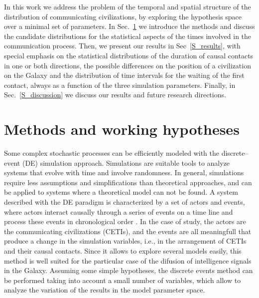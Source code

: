 \documentclass[crop]{CSLB}%
\begin{document}
In this work we address the problem of the temporal and spatial
structure of the distribution of communicating civilizations, by
exploring the hypothesis space over a minimal set of parameters.
%
In Sec.~\ref{S_methods} we introduce the methods and discuss the
candidate distributions for the statistical aspects of the times
involved in the communication process.
%
Then, we present our results in Sec~\ref{S_results}, with special
emphasis on the statistical distributions of the duration of causal
contacts in one or both directions, the possible differences on the
position of a civilization on the Galaxy and the distribution of time
intervals for the waiting of the first contact, always as a function
of the three simulation parameters.
%
Finally, in Sec.~\ref{S_discussion} we discuss our results and future
research directions.




\section{Methods and working hypotheses}\label{S_methods}


Some complex stochastic processes can be efficiently modeled with the
discrete--event (DE) simulation approach.
%
Simulations are suitable tools to analyze systems that evolve with
time and involve randomness.
%
In general, simulations require less assumptions and simplifications
than theoretical approaches, and can be applied to systems where a
theoretical model can not be found.
%
A system described with the DE paradigm is characterized by a set of
actors and events, where actors interact causally through a series of
events on a time line and process these events in chronological order
\citep{ptolemaeus_system_2014, chung_simulation_2003,
ross_simulation_2012}.
%
In the case of study, the actors are the communicating civilizations
(CETIs), and the events are all meaningfull that produce a change in
the simulation variables, i.e., in the arrangement of CETIs and their
causal contacts.
%
Since it allows to explore several models easily, 
this method is well suited for the particular case of the difusion of
intelligence signals in the Galaxy.
%
Assuming some simple hypotheses, the discrete events method can be
performed taking into account a small number of variables, which
allow to analyze the variation of the results in the model parameter space.
\end{document}
